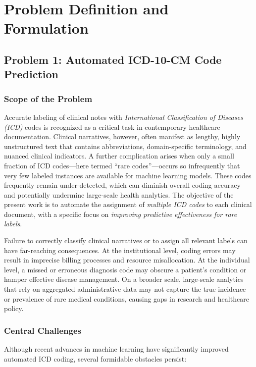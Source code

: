 \chapter{Problem Definition and Formulation}
\label{chap:problem}

\section{Problem 1: Automated ICD-10-CM Code Prediction}
\label{sec:p1:icd_problem}

\subsection{Scope of the Problem}
\label{sec:p1:scope}
Accurate labeling of clinical notes with \emph{International Classification of Diseases (ICD)} codes is recognized as a critical task in contemporary healthcare documentation. Clinical narratives, however, often manifest as lengthy, highly unstructured text that contains abbreviations, domain-specific terminology, and nuanced clinical indicators. A further complication arises when only a small fraction of ICD codes—here termed ``rare codes''—occurs so infrequently that very few labeled instances are available for machine learning models. These codes frequently remain under-detected, which can diminish overall coding accuracy and potentially undermine large-scale health analytics. The objective of the present work is to automate the assignment of \emph{multiple ICD codes} to each clinical document, with a specific focus on \emph{improving predictive effectiveness for rare labels}.

Failure to correctly classify clinical narratives or to assign all relevant labels can have far-reaching consequences. At the institutional level, coding errors may result in imprecise billing processes and resource misallocation. At the individual level, a missed or erroneous diagnosis code may obscure a patient's condition or hamper effective disease management. On a broader scale, large-scale analytics that rely on aggregated administrative data may not capture the true incidence or prevalence of rare medical conditions, causing gaps in research and healthcare policy.

\subsection{Central Challenges}
\label{sec:p1:central_challenges}
Although recent advances in machine learning have significantly improved automated ICD coding, several formidable obstacles persist:

